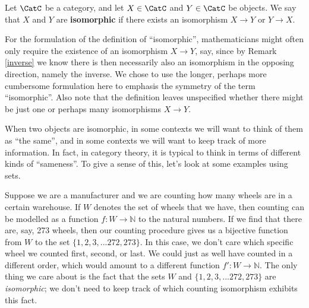 \begin{shaded}
\begin{definition}[Isomorphic]
Let $\CatC$ be a category, and let $X \in \CatC$ and $Y \in \CatC$ be objects. We say that $X$ and $Y$ are \textbf{isomorphic} if there exists an isomorphism $X \rightarrow Y$ or $Y \rightarrow X$. 
\end{definition}
\end{shaded}

For the formulation of the definition of ``isomorphic'', mathematicians might often only require the existence of an isomorphism $X \rightarrow Y$, say, since by Remark \ref{inverse} we know there is then necessarily also an isomorphism in the opposing direction, namely the inverse. We chose to use the longer, perhaps more cumbersome formulation here to emphasis the symmetry of the term ``isomorphic''. Also note that the definition leaves unspecified whether there might be just one or perhaps many isomorphisms $X \rightarrow Y$. 

When two objects are isomorphic, in some contexts we will want to think of them as ``the same'', and in some contexts we will want to keep track of more information. In fact, in category theory, it is typical to think in terms of different kinds of ``sameness''. To give a sense of this, let's look at some examples using sets. 

\begin{example}[Sizes]
Suppose we are a manufacturer and we are counting how many wheels are in a certain warehouse. If $W$ denotes the set of wheels that we have, then counting can be modelled as a function $f: W \rightarrow \mathbb{N}$ to the natural numbers. If we find that there are, say, 273 wheels, then our counting procedure gives us a bijective function from $W$ to the set $\{1, 2, 3,... 272, 273 \}$. In this case, we don't care which specific wheel we counted first, second, or last. We could just as well have counted in a different order, which would amount to a different function $f': W \rightarrow \mathbb{N}$. The only thing we care about is the fact that the sets $W$ and $\{1, 2, 3,... 272, 273 \}$ are \emph{isomorphic}; we don't need to keep track of which counting isomorphism exhibits this fact. 
\end{example}



